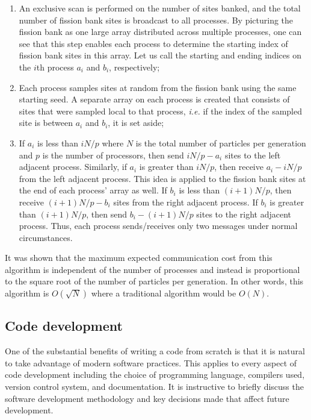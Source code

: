 \documentclass[authoryear,preprint]{elsarticle}
\begin{document}
\begin{enumerate}
\item An exclusive scan is performed on the number of sites banked, and the
  total number of fission bank sites is broadcast to all processes. By picturing
  the fission bank as one large array distributed across multiple processes, one
  can see that this step enables each process to determine the starting index of
  fission bank sites in this array. Let us call the starting and ending indices
  on the $i$th process $a_i$ and $b_i$, respectively;
\item Each process samples sites at random from the fission bank using the same
  starting seed. A separate array on each process is created that consists of
  sites that were sampled local to that process, {\em i.e.} if the index of the
  sampled site is between $a_i$ and $b_i$, it is set aside;
\item If $a_i$ is less than $iN/p$ where $N$ is the total number of particles
  per generation and $p$ is the number of processors, then send $iN/p - a_i$
  sites to the left adjacent process. Similarly, if $a_i$ is greater than
  $iN/p$, then receive $a_i - iN/p$ from the left adjacent process. This idea is
  applied to the fission bank sites at the end of each process' array as
  well. If $b_i$ is less than $(i+1)N/p$, then receive $(i+1)N/p - b_i$ sites
  from the right adjacent process. If $b_i$ is greater than $(i+1)N/p$, then
  send $b_i - (i+1)N/p$ sites to the right adjacent process. Thus, each process
  sends/receives only two messages under normal circumstances.
\end{enumerate}

It was shown \citep{fissionbank} that the maximum expected communication cost
from this algorithm is independent of the number of processes and instead is
proportional to the square root of the number of particles per generation. In
other words, this algorithm is $O({\sqrt{N}})$ where a traditional algorithm
would be $O({N})$.

\subsection{Code development}

One of the substantial benefits of writing a code from scratch is that it is
natural to take advantage of modern software practices. This applies to every
aspect of code development including the choice of programming language,
compilers used, version control system, and documentation. It is instructive to
briefly discuss the software development methodology and key decisions made that
affect future development.
\end{document}
